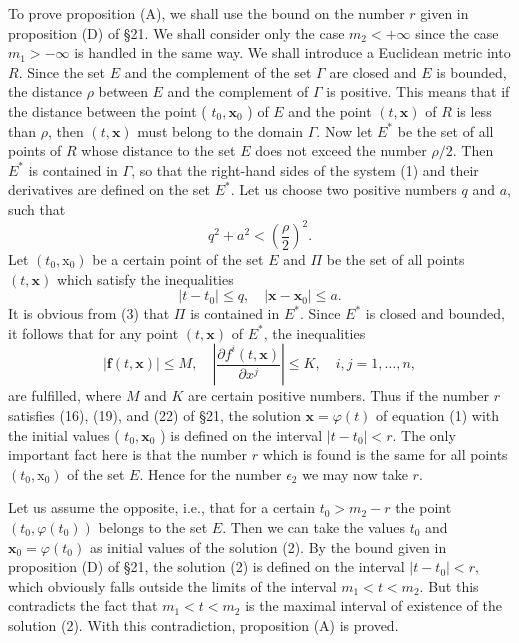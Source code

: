 \documentclass[10pt,a5paper]{book}
\theoremstyle{plain}
\theoremstyle{definition}
\theoremstyle{remark}
\begin{document}
To prove proposition (A), we shall use the bound on the number $r$ given in proposition (D) of §21. We shall consider only the case $m_{2}<+\infty$ since the case $m_{1}>-\infty$ is handled in the same way. We shall introduce a Euclidean metric into $R$. Since the set $E$ and the complement of the set $\Gamma$ are closed and $E$ is bounded, the distance $\rho$ between $E$ and the complement of $\Gamma$ is positive. This means that if the distance between the point ( $t_{0}, \mathbf{x}_{0}$ ) of $E$ and the point $(t, \mathbf{x})$ of $R$ is less than $\rho$, then $(t, \mathbf{x})$ must belong to the domain $\Gamma$. Now let $E^{*}$ be the set of all points of $R$ whose distance to the set $E$ does not exceed the number $\rho / 2$. Then $E^{*}$ is contained in $\Gamma$,
so that the right-hand sides of the system (1) and their derivatives are defined on the set $E^{*}$. Let us choose two positive numbers $q$ and $a$, such that
\begin{equation*}
q^{2}+a^{2}<\left(\frac{\rho}{2}\right)^{2} . \tag{3}
\end{equation*}
Let $\left(t_{0}, \mathrm{x}_{0}\right)$ be a certain point of the set $E$ and $\Pi$ be the set of all points $(t, \mathbf{x})$ which satisfy the inequalities
\[
\left|t-t_{0}\right| \leq q, \quad\left|\mathbf{x}-\mathbf{x}_{0}\right| \leq a .
\]
It is obvious from (3) that $\Pi$ is contained in $E^{*}$. Since $E^{*}$ is closed and bounded, it follows that for any point $(t, \mathbf{x})$ of $E^{*}$, the inequalities
\[
|\mathbf{f}(t, \mathbf{x})| \leq M, \quad\left|\frac{\partial f^{i}(t, \mathbf{x})}{\partial x^{j}}\right| \leq K, \quad i, j=1, \ldots, n,
\]
are fulfilled, where $M$ and $K$ are certain positive numbers. Thus if the number $r$ satisfies (16), (19), and (22) of §21, the solution $\mathbf{x}=\varphi(t)$ of equation (1) with the initial values ( $t_{0}, \mathbf{x}_{0}$ ) is defined on the interval $\left|t-t_{0}\right|<r$. The only important fact here is that the number $r$ which is found is the same for all points $\left(t_{0}, \mathrm{x}_{0}\right)$ of the set $E$. Hence for the number $\epsilon_{2}$ we may now take $r$.

Let us assume the opposite, i.e., that for a certain $t_{0}>m_{2}-r$ the point $\left(t_{0}, \varphi\left(t_{0}\right)\right)$ belongs to the set $E$. Then we can take the values $t_{0}$ and $\mathbf{x}_{0}=\varphi\left(t_{0}\right)$ as initial values of the solution (2). By the bound given in proposition (D) of §21, the solution (2) is defined on the interval $\left|t-t_{0}\right|<r$, which obviously falls outside the limits of the interval $m_{1}<t<m_{2}$. But this contradicts the fact that $m_{1}<t<m_{2}$ is the maximal interval of existence of the solution (2). With this contradiction, proposition (A) is proved.
\end{document}
